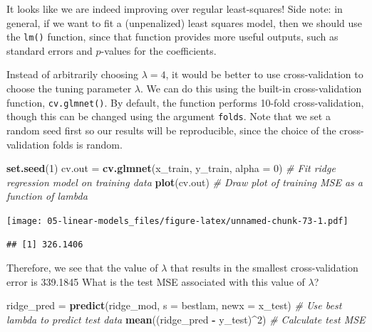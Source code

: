 \documentclass[openany]{book}
\newenvironment{Shaded}{\begin{snugshade}}{\end{snugshade}}
\newcommand{\CommentTok}[1]{\textcolor[rgb]{0.56,0.35,0.01}{\textit{#1}}}
\newcommand{\DataTypeTok}[1]{\textcolor[rgb]{0.13,0.29,0.53}{#1}}
\newcommand{\DecValTok}[1]{\textcolor[rgb]{0.00,0.00,0.81}{#1}}
\newcommand{\KeywordTok}[1]{\textcolor[rgb]{0.13,0.29,0.53}{\textbf{#1}}}
\newcommand{\NormalTok}[1]{#1}
\newcommand{\OperatorTok}[1]{\textcolor[rgb]{0.81,0.36,0.00}{\textbf{#1}}}
\newcommand{\StringTok}[1]{\textcolor[rgb]{0.31,0.60,0.02}{#1}}
\begin{document}
It looks like we are indeed improving over regular least-squares! Side note: in general, if we want to fit a (unpenalized) least squares model, then
we should use the \texttt{lm()} function, since that function provides more useful
outputs, such as standard errors and \(p\)-values for the coefficients.

Instead of arbitrarily choosing \(\lambda = 4\), it would be better to
use cross-validation to choose the tuning parameter \(\lambda\). We can do this using
the built-in cross-validation function, \texttt{cv.glmnet()}. By default, the function
performs 10-fold cross-validation, though this can be changed using the
argument \texttt{folds}. Note that we set a random seed first so our results will be
reproducible, since the choice of the cross-validation folds is random.

\begin{Shaded}
\begin{Highlighting}[]
\KeywordTok{set.seed}\NormalTok{(}\DecValTok{1}\NormalTok{)}
\NormalTok{cv.out =}\StringTok{ }\KeywordTok{cv.glmnet}\NormalTok{(x_train, y_train, }\DataTypeTok{alpha =} \DecValTok{0}\NormalTok{) }\CommentTok{# Fit ridge regression model on training data}
\KeywordTok{plot}\NormalTok{(cv.out) }\CommentTok{# Draw plot of training MSE as a function of lambda}
\end{Highlighting}
\end{Shaded}

\texttt{[image: 05-linear-models\_files/figure-latex/unnamed-chunk-73-1.pdf]}

\begin{Shaded}
\end{Shaded}

\begin{verbatim}
## [1] 326.1406
\end{verbatim}

Therefore, we see that the value of \(\lambda\) that results in the smallest cross-validation
error is 339.1845 What is the test MSE associated with this value of
\(\lambda\)?

\begin{Shaded}
\begin{Highlighting}[]
\NormalTok{ridge_pred =}\StringTok{ }\KeywordTok{predict}\NormalTok{(ridge_mod, }\DataTypeTok{s =}\NormalTok{ bestlam, }\DataTypeTok{newx =}\NormalTok{ x_test) }\CommentTok{# Use best lambda to predict test data}
\KeywordTok{mean}\NormalTok{((ridge_pred }\OperatorTok{-}\StringTok{ }\NormalTok{y_test)}\OperatorTok{^}\DecValTok{2}\NormalTok{) }\CommentTok{# Calculate test MSE}
\end{Highlighting}
\end{Shaded}
\end{document}
